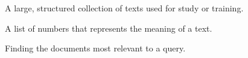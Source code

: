 \begin{glossaryterms}
  \item[Corpus] A large, structured collection of texts used for study or training.
  \item[Embedding] A list of numbers that represents the meaning of a text.
  \item[Retrieval] Finding the documents most relevant to a query.
\end{glossaryterms}
